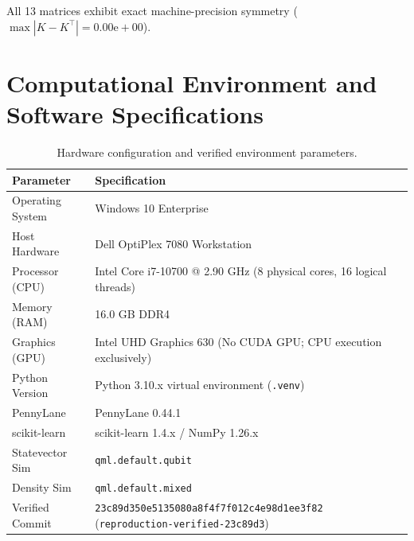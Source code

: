 All 13 matrices exhibit exact machine-precision symmetry ($\max |K - K^\top| = 0.00\mathrm{e}{+}00$).

\section{Computational Environment and Software Specifications}
\label{app:compute-specs}

\begin{table}[H]
\centering
\small
\caption{Hardware configuration and verified environment parameters.}
\begin{tabular}{ll}
\toprule
\textbf{Parameter} & \textbf{Specification} \\
\midrule
Operating System & Windows 10 Enterprise \\
Host Hardware    & Dell OptiPlex 7080 Workstation \\
Processor (CPU)  & Intel Core i7-10700 @ 2.90 GHz (8 physical cores, 16 logical threads) \\
Memory (RAM)     & 16.0 GB DDR4 \\
Graphics (GPU)   & Intel UHD Graphics 630 (No CUDA GPU; CPU execution exclusively) \\
Python Version   & Python 3.10.x virtual environment (\texttt{.venv}) \\
PennyLane        & PennyLane 0.44.1 \\
scikit-learn     & scikit-learn 1.4.x / NumPy 1.26.x \\
Statevector Sim  & \texttt{qml.default.qubit} \\
Density Sim      & \texttt{qml.default.mixed} \\
Verified Commit  & \texttt{23c89d350e5135080a8f4f7f012c4e98d1ee3f82} (\texttt{reproduction-verified-23c89d3}) \\
\bottomrule
\end{tabular}
\end{table}
